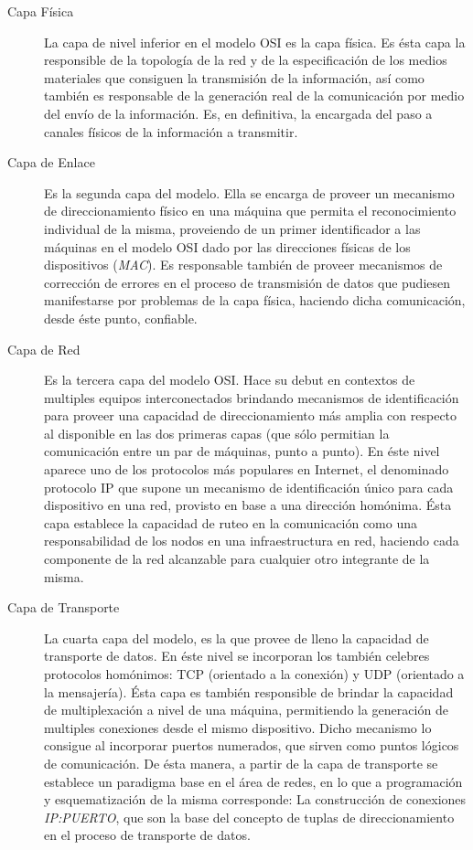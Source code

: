\begin{description}
\item[Capa Física] La capa de nivel inferior en el modelo OSI es la capa física. Es ésta capa la responsible de la topología de la red y de la especificación de los medios materiales que consiguen la transmisión de la información, así como también es responsable de la generación real de la comunicación por medio del envío de la información. Es, en definitiva, la encargada del paso a canales físicos de la información a transmitir.

\item[Capa de Enlace] Es la segunda capa del modelo. Ella se encarga de proveer un mecanismo de direccionamiento físico en una máquina que permita el reconocimiento individual de la misma, proveiendo de un primer identificador a las máquinas en el modelo OSI dado por las direcciones físicas de los dispositivos (\emph{MAC}). Es responsable también de proveer mecanismos de corrección de errores en el proceso de transmisión de datos que pudiesen manifestarse por problemas de la capa física, haciendo dicha comunicación, desde éste punto, confiable.

\item[Capa de Red] Es la tercera capa del modelo OSI. Hace su debut en contextos de multiples equipos interconectados brindando mecanismos de identificación para proveer una capacidad de direccionamiento más amplia con respecto al disponible en las dos primeras capas (que sólo permitian la comunicación entre un par de máquinas, punto a punto). En éste nivel aparece uno de los protocolos más populares en Internet, el denominado protocolo IP que supone un mecanismo de identificación único para cada dispositivo en una red, provisto en base a una dirección homónima. Ésta capa establece la capacidad de ruteo en la comunicación como una responsabilidad de los nodos en una infraestructura en red, haciendo cada componente de la red alcanzable para cualquier otro integrante de la misma.

\item[Capa de Transporte] La cuarta capa del modelo, es la que provee de lleno la capacidad de transporte de datos. En éste nivel se incorporan los también celebres protocolos homónimos: TCP (orientado a la conexión) y UDP (orientado a la mensajería). Ésta capa es también responsible de brindar la capacidad de multiplexación a nivel de una máquina, permitiendo la generación de multiples conexiones desde el mismo dispositivo. Dicho mecanismo lo consigue al incorporar puertos numerados, que sirven como puntos lógicos de comunicación. De ésta manera, a partir de la capa de transporte se establece un paradigma base en el área de redes, en lo que a programación y esquematización de la misma corresponde: La construcción de conexiones \emph{IP:PUERTO}, que son la base del concepto de tuplas de direccionamiento en el proceso de transporte de datos.


\end{description}
